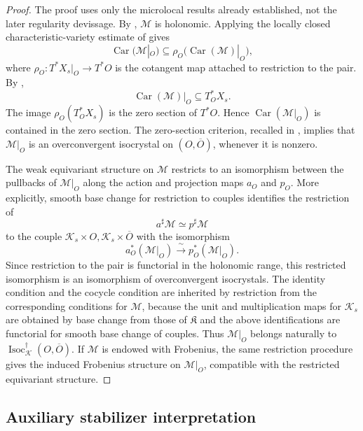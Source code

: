 \documentclass[11pt]{amsart}
\theoremstyle{plain}
\theoremstyle{definition}
\theoremstyle{remark}
\newcommand{\Isoc}{\operatorname{Isoc}}
\newcommand{\Car}{\operatorname{Car}}
\begin{document}
\begin{proof}
The proof uses only the microlocal results already established, not the later
regularity devissage.  By ,
\(\mathcal M\) is holonomic.  Applying the locally closed characteristic-variety
estimate of  gives
\[
  \Car(\mathcal M|_O)
  \subseteq
  \rho_O\bigl(\Car(\mathcal M)|_O\bigr),
\]
where \(\rho_O:T^*X_s|_O\to T^*O\) is the cotangent map attached to restriction
to the pair.  By ,
\[
  \Car(\mathcal M)|_O
  \subseteq
  T^*_O X_s.
\]
The image \(\rho_O(T^*_O X_s)\) is the zero section of \(T^*O\).  Hence
\(\Car(\mathcal M|_O)\) is contained in the zero section.  The zero-section
criterion, recalled in , implies that
\(\mathcal M|_O\) is an overconvergent isocrystal on \((O,\overline O)\),
whenever it is nonzero.

The weak equivariant structure on \(\mathcal M\) restricts to an isomorphism
between the pullbacks of \(\mathcal M|_O\) along the action and projection maps
\(a_O\) and \(p_O\).  More explicitly, smooth base change for restriction to
couples identifies the restriction of
\[
  a^\sharp\mathcal M\simeq p^\sharp\mathcal M
\]
to the couple
\(\mathcal K_s\times O,\mathcal K_s\times\overline O\) with the isomorphism
\[
  a_O^*(\mathcal M|_O)
  \xrightarrow{\;\sim\;}
  p_O^*(\mathcal M|_O).
\]
Since restriction to the pair is functorial in the holonomic range, this
restricted isomorphism is an isomorphism of overconvergent isocrystals.  The identity
condition and the cocycle condition are inherited by restriction from the
corresponding conditions for \(\mathcal M\), because the unit and multiplication
maps for \(\mathcal K_s\) are obtained by base change from those of
\(\mathfrak K\) and the above identifications are functorial for smooth base
change of couples. Thus \(\mathcal M|_O\) belongs naturally to
\(\Isoc^\dagger_{\mathcal K}(O,\overline O)\).  If \(\mathcal M\) is endowed
with Frobenius, the same restriction procedure gives the induced Frobenius
structure on \(\mathcal M|_O\), compatible with the restricted equivariant
structure.
\end{proof}




\subsection{Auxiliary stabilizer interpretation}
\label{subsec:stabilizer-description-pointer}
\end{document}
